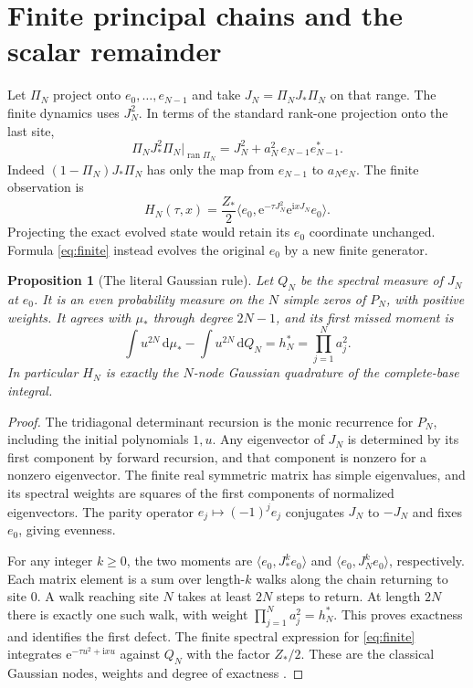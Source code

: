 \documentclass[11pt]{article}
\numberwithin{equation}{section}
\newtheorem{proposition}[theorem]{Proposition}
\newcommand{\ee}{\mathrm e}
\newcommand{\ii}{\mathrm i}
\newcommand{\dd}{\,\mathrm d}
\newcommand{\ip}[2]{\langle #1,#2\rangle}
\begin{document}
\section{Finite principal chains and the scalar remainder}\label{sec:quad}

Let \(\Pi_N\) project onto \(e_0,\ldots,e_{N-1}\) and take
\(J_N=\Pi_NJ_*\Pi_N\) on that range. The finite dynamics uses
\(J_N^2\). In terms of the standard rank-one projection onto the
last site,
\begin{equation}\label{eq:boundary}
 \Pi_NJ_*^2\Pi_N\big|_{\operatorname{ran}\Pi_N}
       =J_N^2+a_N^2\, e_{N-1}e_{N-1}^* .
\end{equation}
Indeed \((1-\Pi_N)J_*\Pi_N\) has only the map from \(e_{N-1}\)
to \(a_Ne_N\). The finite observation is
\begin{equation}\label{eq:finite}
 H_N(\tau,x)=\frac{Z_*}{2}
      \ip{e_0}{\ee^{-\tau J_N^2}\ee^{\ii xJ_N}e_0}.
\end{equation}
Projecting the exact evolved state would retain its \(e_0\)
coordinate unchanged. Formula \eqref{eq:finite} instead evolves
the original \(e_0\) by a new finite generator.

\begin{proposition}[The literal Gaussian rule]\label{prop:gauss}
Let \(Q_N\) be the spectral measure of \(J_N\) at \(e_0\).
It is an even probability measure on the \(N\) simple zeros of
\(P_N\), with positive weights. It agrees with \(\mu_*\) through
degree \(2N-1\), and its first missed moment is
\[
 \int u^{2N}\dd\mu_*-\int u^{2N}\dd Q_N=h_N^*
            =\prod_{j=1}^N a_j^2 .
\]
In particular \(H_N\) is exactly the \(N\)-node Gaussian
quadrature of the complete-base integral.
\end{proposition}
\begin{proof}
The tridiagonal determinant recursion is the monic recurrence
for \(P_N\), including the initial polynomials \(1,u\). Any
eigenvector of \(J_N\) is determined by its first component by
forward recursion, and that component is nonzero for a nonzero
eigenvector. The finite real symmetric matrix has simple
eigenvalues, and its spectral weights are squares of the first
components of normalized eigenvectors. The parity operator
\(e_j\mapsto(-1)^je_j\) conjugates \(J_N\) to \(-J_N\) and
fixes \(e_0\), giving evenness.

For any integer \(k\ge0\), the two moments are
\(\ip{e_0}{J_*^ke_0}\) and \(\ip{e_0}{J_N^ke_0}\),
respectively. Each matrix element is a sum over length-\(k\)
walks along the chain returning to site \(0\). A walk reaching
site \(N\) takes at least \(2N\) steps to return. At length
\(2N\) there is exactly one such walk, with weight
\(\prod_{j=1}^Na_j^2=h_N^*\). This proves exactness and identifies
the first defect. The finite spectral expression for
\eqref{eq:finite} integrates \(\ee^{-\tau u^2+\ii xu}\) against
\(Q_N\) with the factor \(Z_*/2\). These are the classical
Gaussian nodes, weights and degree of exactness \cite{gauss}.
\end{proof}
\end{document}
